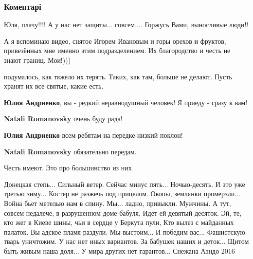  
 
 
 
 
\subsubsection{Коментарі}

\begin{itemize} %
Юля, плачу!!!! А у нас нет защиты... совсем.... Горжусь Вами, выносливые люди!!


А я вспоминаю видео, снятое Игорем Ивановым и горы орехов и фруктов,
привезённых мне именно этим подразделением. Их благородство и честь не знают
границ. Мои!)))

\begin{itemize} %
подумалось, как тяжело их терять. Таких, как там, больше не делают. Пусть хранят их все святые, какие есть.
\end{itemize} %

\textbf{Юлия Андриенко}, вы - редкий неравнодушный человек! Я приеду - сразу к вам!

\begin{itemize} %
\textbf{Natali Romanovsky} очень буду рада!

\textbf{Юлия Андриенко} всем ребятам на передке-низкий поклон!

\textbf{Natali Romanovsky} обязательно передам.
\end{itemize} %

Честь имеют. Это про большинство из них


\obeycr
Донецкая степь... Сильный ветер. Сейчас минус пять... Ночью-десять.
И это уже третью зиму...
Костер не разжечь под прицелом. Окопы, землянки промерзли...
Война бьет метелью нам в спину.
Мы... ладно, привыкли. Мужчины. А тут, совсем недалече, в разрушенном доме бабуля,
Идет ей девятый десяток.
Эй, те, кто жег в Киеве шины, чьи в сердце у Беркута пули,
Кто вылез с майданных палаток.
Вы адское пламя раздули.
Мы выстоим... И победим вас... Фашистскую тварь уничтожим.
У нас нет иных вариантов.
За бабушек наших и деток... Щитом быть живым наша доля...
У мира других нет гарантов...
Снежана Аэндо
2016
\restorecr


\end{itemize}
